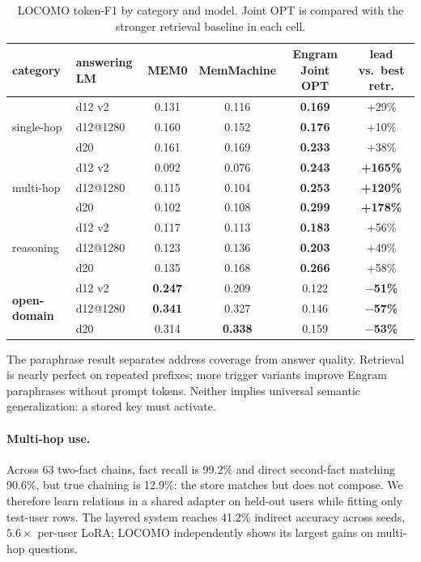\documentclass[letterpaper]{article} %
\begin{document}
\begin{table}[t]
  \centering
  \small
  \begin{tabular}{llcccc}
    \toprule
    category & answering LM & MEM0 & MemMachine & \textbf{Engram Joint OPT} & lead vs.\ best retr. \\
    \midrule
    \multirow{3}{*}{single-hop} & d12 v2 & 0.131 & 0.116 & \textbf{0.169} & +29\% \\
      & d12@1280 & 0.160 & 0.152 & \textbf{0.176} & +10\% \\
      & d20 & 0.161 & 0.169 & \textbf{0.233} & +38\% \\
    \midrule
    \multirow{3}{*}{multi-hop} & d12 v2 & 0.092 & 0.076 & \textbf{0.243} & \textbf{+165\%} \\
      & d12@1280 & 0.115 & 0.104 & \textbf{0.253} & \textbf{+120\%} \\
      & d20 & 0.102 & 0.108 & \textbf{0.299} & \textbf{+178\%} \\
    \midrule
    \multirow{3}{*}{reasoning} & d12 v2 & 0.117 & 0.113 & \textbf{0.183} & +56\% \\
      & d12@1280 & 0.123 & 0.136 & \textbf{0.203} & +49\% \\
      & d20 & 0.135 & 0.168 & \textbf{0.266} & +58\% \\
    \midrule
    \multirow{3}{*}{\textbf{open-domain}} & d12 v2 & \textbf{0.247} & 0.209 & 0.122 & \textbf{$-$51\%} \\
      & d12@1280 & \textbf{0.341} & 0.327 & 0.146 & \textbf{$-$57\%} \\
      & d20 & 0.314 & \textbf{0.338} & 0.159 & \textbf{$-$53\%} \\
    \bottomrule
  \end{tabular}
  \caption{LOCOMO token-F1 by category and model. Joint OPT is compared with
  the stronger retrieval baseline in each cell.}
  \label{tab:locomo-categories}
\end{table}

The paraphrase result separates address coverage from answer quality.
Retrieval is nearly perfect on repeated prefixes; more trigger variants improve
Engram paraphrases without prompt tokens. Neither implies universal semantic
generalization: a stored key must activate.

\paragraph{Multi-hop use.}
Across 63 two-fact chains, fact recall is 99.2\% and direct second-fact matching
90.6\%, but true chaining is 12.9\%: the store matches but does not compose.
We therefore learn relations in a shared adapter on held-out users while
fitting only test-user rows. The layered system reaches 41.2\% indirect
accuracy across seeds, $5.6\times$ per-user LoRA; LOCOMO independently shows
its largest gains on multi-hop questions.
\end{document}
